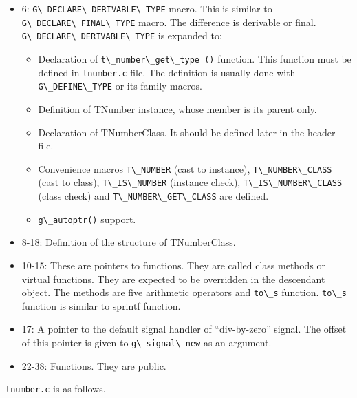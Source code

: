 \begin{itemize}
\tightlist
\item
  6: \passthrough{\lstinline!G\_DECLARE\_DERIVABLE\_TYPE!} macro. This
  is similar to \passthrough{\lstinline!G\_DECLARE\_FINAL\_TYPE!} macro.
  The difference is derivable or final.
  \passthrough{\lstinline!G\_DECLARE\_DERIVABLE\_TYPE!} is expanded to:

  \begin{itemize}
  \tightlist
  \item
    Declaration of \passthrough{\lstinline!t\_number\_get\_type ()!}
    function. This function must be defined in
    \passthrough{\lstinline!tnumber.c!} file. The definition is usually
    done with \passthrough{\lstinline!G\_DEFINE\_TYPE!} or its family
    macros.
  \item
    Definition of TNumber instance, whose member is its parent only.
  \item
    Declaration of TNumberClass. It should be defined later in the
    header file.
  \item
    Convenience macros \passthrough{\lstinline!T\_NUMBER!} (cast to
    instance), \passthrough{\lstinline!T\_NUMBER\_CLASS!} (cast to
    class), \passthrough{\lstinline!T\_IS\_NUMBER!} (instance check),
    \passthrough{\lstinline!T\_IS\_NUMBER\_CLASS!} (class check) and
    \passthrough{\lstinline!T\_NUMBER\_GET\_CLASS!} are defined.
  \item
    \passthrough{\lstinline!g\_autoptr()!} support.
  \end{itemize}
\item
  8-18: Definition of the structure of TNumberClass.
\item
  10-15: These are pointers to functions. They are called class methods
  or virtual functions. They are expected to be overridden in the
  descendant object. The methods are five arithmetic operators and
  \passthrough{\lstinline!to\_s!} function.
  \passthrough{\lstinline!to\_s!} function is similar to sprintf
  function.
\item
  17: A pointer to the default signal handler of ``div-by-zero'' signal.
  The offset of this pointer is given to
  \passthrough{\lstinline!g\_signal\_new!} as an argument.
\item
  22-38: Functions. They are public.
\end{itemize}

\passthrough{\lstinline!tnumber.c!} is as follows.


